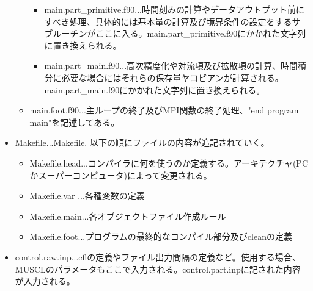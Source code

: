 \documentclass{jsarticle}
\begin{document}
\begin{itemize}
\begin{itemize}
\begin{itemize}
\item main.part\_primitive.f90...時間刻みの計算やデータアウトプット前にすべき処理、具体的には基本量の計算及び境界条件の設定をするサブルーチンがここに入る。main.part\_primitive.f90にかかれた文字列に置き換えられる。
\item main.part\_main.f90...高次精度化や対流項及び拡散項の計算、時間積分に必要な場合にはそれらの保存量ヤコビアンが計算される。main.part\_main.f90にかかれた文字列に置き換えられる。
\end{itemize}
\item main.foot.f90...主ループの終了及びMPI関数の終了処理、"end program main"を記述してある。
\end{itemize}
\item Makefile...Makefile. 以下の順にファイルの内容が追記されていく。
\begin{itemize}
\item Makefile.head...コンパイラに何を使うのか定義する。アーキテクチャ(PCかスーパーコンピュータ)によって変更される。
\item Makefile.var ...各種変数の定義
\item Makefile.main...各オブジェクトファイル作成ルール
\item Makefile.foot...プログラムの最終的なコンパイル部分及びcleanの定義
\end{itemize}
\item control.raw.inp...cflの定義やファイル出力間隔の定義など。使用する場合、MUSCLのパラメータもここで入力される。control.part.inpに記された内容が入力される。
\end{itemize}
\end{document}

